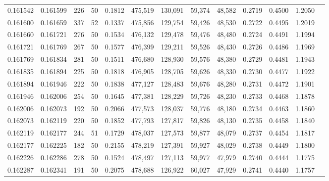 \begin{tabular}{rrrrrrrrrrrrr}
0.161542 & 0.161599 &   226 &  50 &                                     0.1812 & 475,519 & 130,091 &  59,374 &  48,582 & 0.2719 & 0.4500 & 1.2050 \\
0.161600 & 0.161659 &   337 &  52 &                                     0.1337 & 475,856 & 129,754 &  59,426 &  48,530 & 0.2722 & 0.4495 & 1.2019 \\
0.161660 & 0.161721 &   276 &  50 &                                     0.1534 & 476,132 & 129,478 &  59,476 &  48,480 & 0.2724 & 0.4491 & 1.1994 \\
0.161721 & 0.161769 &   267 &  50 &                                     0.1577 & 476,399 & 129,211 &  59,526 &  48,430 & 0.2726 & 0.4486 & 1.1969 \\
0.161769 & 0.161834 &   281 &  50 &                                     0.1511 & 476,680 & 128,930 &  59,576 &  48,380 & 0.2729 & 0.4481 & 1.1943 \\
0.161835 & 0.161894 &   225 &  50 &                                     0.1818 & 476,905 & 128,705 &  59,626 &  48,330 & 0.2730 & 0.4477 & 1.1922 \\
0.161894 & 0.161946 &   222 &  50 &                                     0.1838 & 477,127 & 128,483 &  59,676 &  48,280 & 0.2731 & 0.4472 & 1.1901 \\
0.161946 & 0.162006 &   254 &  50 &                                     0.1645 & 477,381 & 128,229 &  59,726 &  48,230 & 0.2733 & 0.4468 & 1.1878 \\
0.162006 & 0.162073 &   192 &  50 &                                     0.2066 & 477,573 & 128,037 &  59,776 &  48,180 & 0.2734 & 0.4463 & 1.1860 \\
0.162073 & 0.162119 &   220 &  50 &                                     0.1852 & 477,793 & 127,817 &  59,826 &  48,130 & 0.2735 & 0.4458 & 1.1840 \\
0.162119 & 0.162177 &   244 &  51 &                                     0.1729 & 478,037 & 127,573 &  59,877 &  48,079 & 0.2737 & 0.4454 & 1.1817 \\
0.162177 & 0.162225 &   182 &  50 &                                     0.2155 & 478,219 & 127,391 &  59,927 &  48,029 & 0.2738 & 0.4449 & 1.1800 \\
0.162226 & 0.162286 &   278 &  50 &                                     0.1524 & 478,497 & 127,113 &  59,977 &  47,979 & 0.2740 & 0.4444 & 1.1775 \\
0.162287 & 0.162341 &   191 &  50 &                                     0.2075 & 478,688 & 126,922 &  60,027 &  47,929 & 0.2741 & 0.4440 & 1.1757 \\

\end{tabular}

